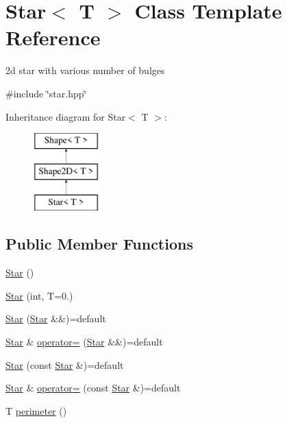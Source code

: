 \hypertarget{classStar}{}\section{Star$<$ T $>$ Class Template Reference}
\label{classStar}


2d star with various number of bulges  




{\ttfamily \#include \char`\"{}star.\+hpp\char`\"{}}

Inheritance diagram for Star$<$ T $>$\+:\begin{figure}[H]
\begin{center}
\leavevmode
\includegraphics[height=3.000000cm]{classStar}
\end{center}
\end{figure}
\subsection*{Public Member Functions}
\begin{DoxyCompactItemize}
\item 
\mbox{\hyperlink{classStar_a4be07c82320f781071409294614df4ae}{Star}} ()
\item 
\mbox{\hyperlink{classStar_aa179936ed93e38e70992cb4f6e3cbff3}{Star}} (int, T=0.)
\item 
\mbox{\hyperlink{classStar_af518471484341cad6b47ad42d4e637fe}{Star}} (\mbox{\hyperlink{classStar}{Star}} \&\&)=default
\item 
\mbox{\hyperlink{classStar}{Star}} \& \mbox{\hyperlink{classStar_a7113d2808314f0aa2f5a87325f8c535d}{operator=}} (\mbox{\hyperlink{classStar}{Star}} \&\&)=default
\item 
\mbox{\hyperlink{classStar_a047ce2a8d4fb409858555aee98b33c93}{Star}} (const \mbox{\hyperlink{classStar}{Star}} \&)=default
\item 
\mbox{\hyperlink{classStar}{Star}} \& \mbox{\hyperlink{classStar_a3507f157448e082ccfcadc4783f2610e}{operator=}} (const \mbox{\hyperlink{classStar}{Star}} \&)=default
\item 
T \mbox{\hyperlink{classStar_a908253192d0b1fe95aeeaa81322545bf}{perimeter}} ()
\end{DoxyCompactItemize}

